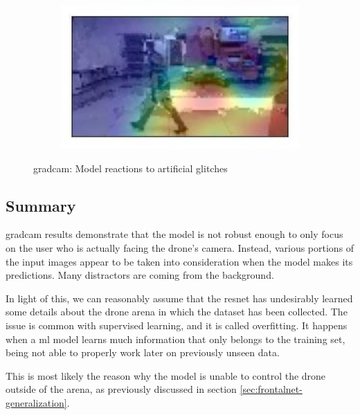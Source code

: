 \begin{figure}[!h]
\begin{center}
\begin{subfigure}[h]{0.24\textwidth}
		\end{subfigure}
		\hfill
		\begin{subfigure}[h]{0.24\textwidth}
			\centering
			\includegraphics[width=1\textwidth]{"contents/images/gradcam/gradcam-glitch-4"}
		\end{subfigure}
	\end{center}
	\vspace{-0.5cm}
	\caption[\gls{gradcam}: Model reactions to artificial glitches]{\gls{gradcam}: Model reactions to artificial glitches}
	\label{fig:gradcam-glitch}
\end{figure}



\subsection{Summary}
\label{subsec:gradcam-summary}

\gls{gradcam} results demonstrate that the model is not robust enough to only focus on the user who is actually facing the drone's camera. Instead, various portions of the input images appear to be taken into consideration when the model makes its predictions. Many distractors are coming from the background.

In light of this, we can reasonably assume that the \gls{resnet} has undesirably learned some details about the drone arena in which the dataset has been collected. The issue is common with supervised learning, and it is called overfitting. It happens when a \gls{ml} model learns much information that only belongs to the training set, being not able to properly work later on previously unseen data.

This is most likely the reason why the model is unable to control the drone outside of the arena, as previously discussed in section \ref{sec:frontalnet-generalization}.




